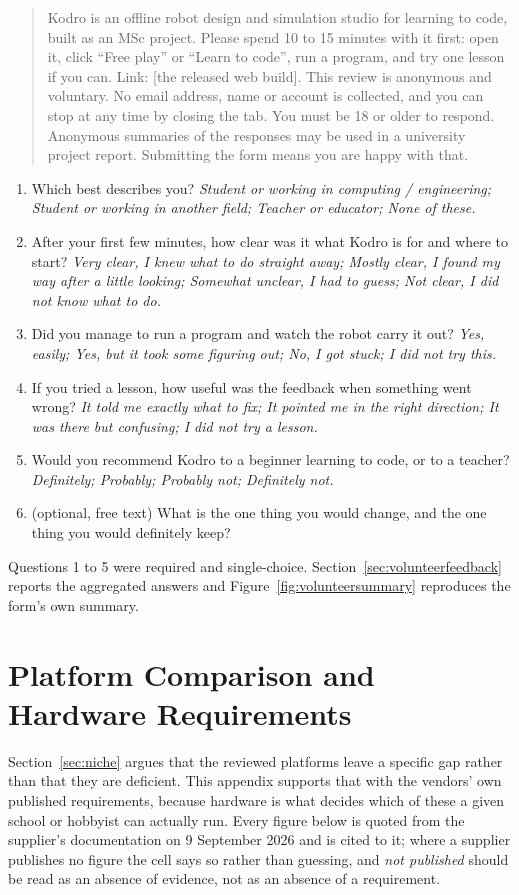 \documentclass[11pt,a4paper]{report}
\begin{document}
\begin{quote}\small
Kodro is an offline robot design and simulation studio for learning to code, built as an MSc project. Please spend 10 to 15 minutes with it first: open it, click ``Free play'' or ``Learn to code'', run a program, and try one lesson if you can. Link: [the released web build]. This review is anonymous and voluntary. No email address, name or account is collected, and you can stop at any time by closing the tab. You must be 18 or older to respond. Anonymous summaries of the responses may be used in a university project report. Submitting the form means you are happy with that.
\end{quote}

\begin{enumerate}[label=Q\arabic*.,leftmargin=*,itemsep=1pt]\small
\item Which best describes you? \emph{Student or working in computing / engineering; Student or working in another field; Teacher or educator; None of these.}
\item After your first few minutes, how clear was it what Kodro is for and where to start? \emph{Very clear, I knew what to do straight away; Mostly clear, I found my way after a little looking; Somewhat unclear, I had to guess; Not clear, I did not know what to do.}
\item Did you manage to run a program and watch the robot carry it out? \emph{Yes, easily; Yes, but it took some figuring out; No, I got stuck; I did not try this.}
\item If you tried a lesson, how useful was the feedback when something went wrong? \emph{It told me exactly what to fix; It pointed me in the right direction; It was there but confusing; I did not try a lesson.}
\item Would you recommend Kodro to a beginner learning to code, or to a teacher? \emph{Definitely; Probably; Probably not; Definitely not.}
\item (optional, free text) What is the one thing you would change, and the one thing you would definitely keep?
\end{enumerate}
Questions 1 to 5 were required and single-choice. Section~\ref{sec:volunteerfeedback} reports the aggregated answers and Figure~\ref{fig:volunteersummary} reproduces the form's own summary.
\fi

\chapter{Platform Comparison and Hardware Requirements}
\label{app:comparison}
Section~\ref{sec:niche} argues that the reviewed platforms leave a specific gap rather than that they are deficient. This appendix supports that with the vendors' own published requirements, because hardware is what decides which of these a given school or hobbyist can actually run. Every figure below is quoted from the supplier's documentation on 9 September 2026 and is cited to it; where a supplier publishes no figure the cell says so rather than guessing, and \emph{not published} should be read as an absence of evidence, not as an absence of a requirement.
\end{document}
